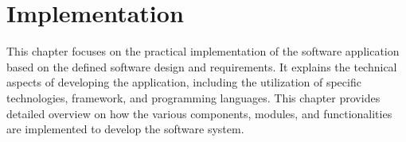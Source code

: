 \chapter{Implementation}
This chapter focuses on the practical implementation of the software application based on the defined software design and requirements.
It explains the technical aspects of developing the application, including the utilization of specific technologies, framework, and programming languages.
This chapter provides detailed overview on how the various components, modules, and functionalities are implemented to develop the software system.







